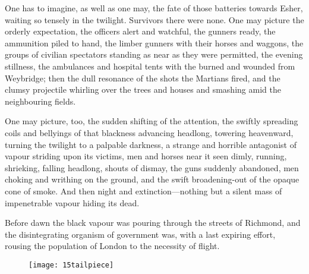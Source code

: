 One has to imagine, as well as one may, the fate of those batteries towards Esher, waiting so tensely in the twilight. Survivors there were none. One may picture the orderly expectation, the officers alert and watchful, the gunners ready, the ammunition piled to hand, the limber gunners with their horses and waggons, the groups of civilian spectators standing as near as they were permitted, the evening stillness, the ambulances and hospital tents with the burned and wounded from Weybridge; then the dull resonance of the shots the Martians fired, and the clumsy projectile whirling over the trees and houses and smashing amid the neighbouring fields.

One may picture, too, the sudden shifting of the attention, the swiftly spreading coils and bellyings of that blackness advancing headlong, towering heavenward, turning the twilight to a palpable darkness, a strange and horrible antagonist of vapour striding upon its victims, men and horses near it seen dimly, running, shrieking, falling headlong, shouts of dismay, the guns suddenly abandoned, men choking and writhing on the ground, and the swift broadening-out of the opaque cone of smoke. And then night and extinction—nothing but a silent mass of impenetrable vapour hiding its dead.

Before dawn the black vapour was pouring through the streets of Richmond, and the disintegrating organism of government was, with a last expiring effort, rousing the population of London to the necessity of flight.

\begin{figure}[b!]
\centering
\texttt{[image: 15tailpiece]}
\end{figure}
\enlargethispage{\baselineskip}